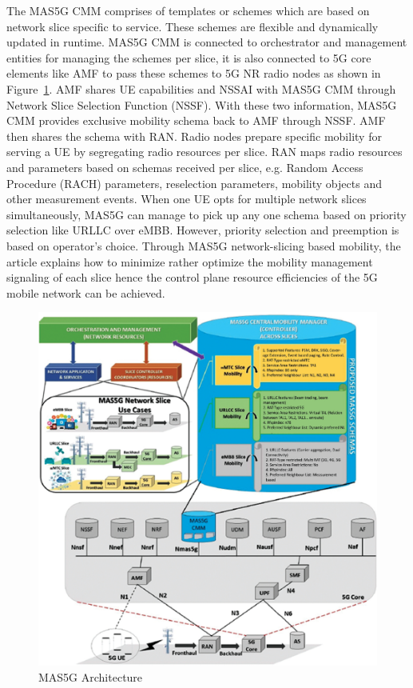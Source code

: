 \begin{multicols}{2}
The MAS5G CMM comprises of templates or schemes which are based on network slice specific to service. These schemes are flexible and dynamically updated in runtime. MAS5G CMM is connected to orchestrator and management entities for managing the schemes per slice, it is also connected to 5G core elements like AMF to pass these schemes to 5G NR radio nodes as shown in Figure~\ref{chap1-fig03}. AMF shares UE capabilities and NSSAI with MAS5G CMM through Network Slice Selection Function (NSSF). With these two information, MAS5G CMM provides exclusive mobility schema back to AMF through NSSF. AMF then shares the schema with RAN. Radio nodes prepare specific mobility for serving a UE by segregating radio resources per slice. RAN maps radio resources and parameters based on schemas received per slice, e.g. Random Access Procedure (RACH) parameters, reselection parameters, mobility objects and other measurement events. When one UE opts for multiple network slices simultaneously, MAS5G can manage to pick up any one schema based on priority selection like URLLC over eMBB. However, priority selection and preemption is based on operator’s choice. Through MAS5G network-slicing based mobility, the article explains how to minimize rather optimize the mobility management signaling of each slice hence the control plane resource efficiencies of the 5G mobile network can be achieved. 
\end{multicols}

\begin{figure}[H]
\centering
\includegraphics[scale=.8]{src/Figures/chap1/chap1-fig03.jpg}
\caption{MAS5G Architecture}\label{chap1-fig03}
\end{figure}

